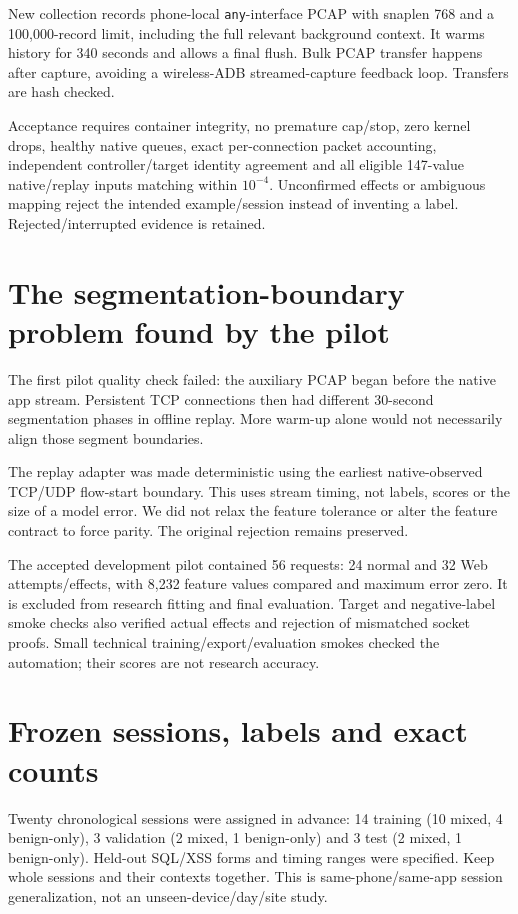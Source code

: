 \documentclass[11pt,a4paper,oneside]{report}
\newcommand{\code}[1]{\nolinkurl{#1}}
\begin{document}
New collection records phone-local \code{any}-interface PCAP with snaplen 768 and a 100,000-record limit, including the full relevant background context. It warms history for 340 seconds and allows a final flush. Bulk PCAP transfer happens after capture, avoiding a wireless-ADB streamed-capture feedback loop. Transfers are hash checked.

Acceptance requires container integrity, no premature cap/stop, zero kernel drops, healthy native queues, exact per-connection packet accounting, independent controller/target identity agreement and all eligible 147-value native/replay inputs matching within $10^{-4}$. Unconfirmed effects or ambiguous mapping reject the intended example/session instead of inventing a label. Rejected/interrupted evidence is retained.

\section{The segmentation-boundary problem found by the pilot}
The first pilot quality check failed: the auxiliary PCAP began before the native app stream. Persistent TCP connections then had different 30-second segmentation phases in offline replay. More warm-up alone would not necessarily align those segment boundaries.

The replay adapter was made deterministic using the earliest native-observed TCP/UDP flow-start boundary. This uses stream timing, not labels, scores or the size of a model error. We did not relax the feature tolerance or alter the feature contract to force parity. The original rejection remains preserved.

The accepted development pilot contained 56 requests: 24 normal and 32 Web attempts/effects, with 8,232 feature values compared and maximum error zero. It is excluded from research fitting and final evaluation. Target and negative-label smoke checks also verified actual effects and rejection of mismatched socket proofs. Small technical training/export/evaluation smokes checked the automation; their scores are not research accuracy.

\section{Frozen sessions, labels and exact counts}
Twenty chronological sessions were assigned in advance: 14 training (10 mixed, 4 benign-only), 3 validation (2 mixed, 1 benign-only) and 3 test (2 mixed, 1 benign-only). Held-out SQL/XSS forms and timing ranges were specified. Keep whole sessions and their contexts together. This is same-phone/same-app session generalization, not an unseen-device/day/site study.
\end{document}
